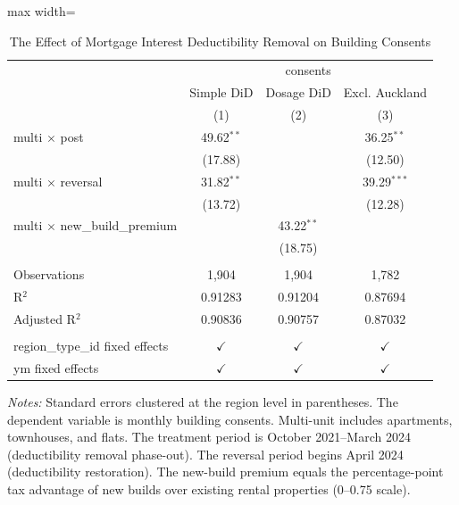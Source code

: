 
\begin{table}[htbp]
   \caption{\label{tab:main} The Effect of Mortgage Interest Deductibility Removal on Building Consents}
   \bigskip
   \centering
   \begin{adjustbox}{max width=\textwidth}
   \begin{tabular}{lccc}
      \toprule
       & \multicolumn{3}{c}{consents}\\
                                            & Simple DiD    & Dosage DiD    & Excl. Auckland \\   
                                            & (1)           & (2)           & (3)\\  
      \midrule 
      multi $\times$ post                   & 49.62$^{**}$  &               & 36.25$^{**}$\\   
                                            & (17.88)       &               & (12.50)\\   
      multi $\times$ reversal               & 31.82$^{**}$  &               & 39.29$^{***}$\\   
                                            & (13.72)       &               & (12.28)\\   
      multi $\times$ new\_build\_premium    &               & 43.22$^{**}$  &   \\   
                                            &               & (18.75)       &   \\   
       \\
      Observations                          & 1,904         & 1,904         & 1,782\\  
      R$^2$                                 & 0.91283       & 0.91204       & 0.87694\\  
      Adjusted R$^2$                        & 0.90836       & 0.90757       & 0.87032\\  
       \\
      region\_type\_id fixed effects        & $\checkmark$  & $\checkmark$  & $\checkmark$\\   
      ym fixed effects                      & $\checkmark$  & $\checkmark$  & $\checkmark$\\   
      \bottomrule
   \end{tabular}
   \end{adjustbox}

   \par \raggedright \footnotesize
   \textit{Notes:} Standard errors clustered at the region level in parentheses. The dependent variable is monthly building consents. Multi-unit includes apartments, townhouses, and flats. The treatment period is October 2021--March 2024 (deductibility removal phase-out). The reversal period begins April 2024 (deductibility restoration). The new-build premium equals the percentage-point tax advantage of new builds over existing rental properties (0--0.75 scale).
\end{table}


